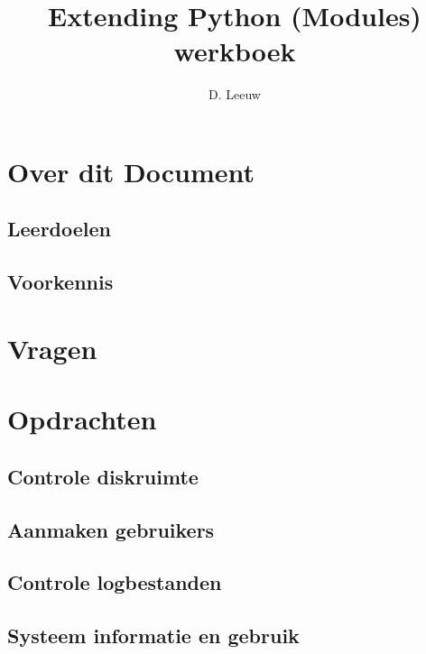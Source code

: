 \documentclass[a4paper,12pt,twoside,openright,titlepage]{article}
\author{D. Leeuw}
\title{Extending Python (Modules) werkboek}
\date{\today\\
\vfill
\raggedright
\copyright\ 2025 Dennis Leeuw\\
}
\begin{document}

\maketitle


\section{Over dit Document}
\subsection{Leerdoelen}

\subsection{Voorkennis}




\section{Vragen}

\section{Opdrachten}
\subsection{Controle diskruimte}

\subsection{Aanmaken gebruikers}

\subsection{Controle logbestanden}

\subsection{Systeem informatie en gebruik}


\printindex
\end{document}
